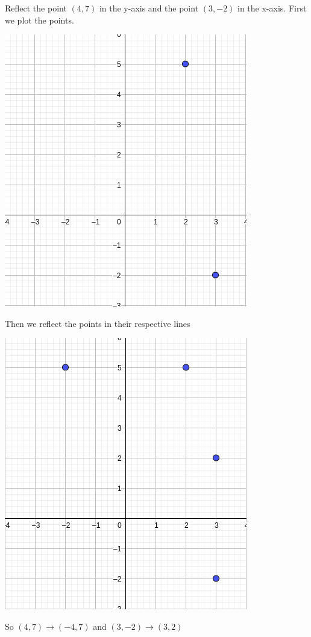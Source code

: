 \begin{exmp}
	Reflect the point $(4,7)$ in the y-axis and the point $(3, -2)$ in the x-axis.
	First we plot the points.

	\bigskip

		\includegraphics[scale=0.6]{./Images/Transformations/Reflections_ex_3.png}

	\bigskip

	Then we reflect the points in their respective lines

	\bigskip

		\includegraphics[scale=0.6]{./Images/Transformations/Reflections_ex_4.png}

	\bigskip

	So $(4,7) \rightarrow (-4,7)$ and $(3, -2) \rightarrow (3, 2)$
\end{exmp}
